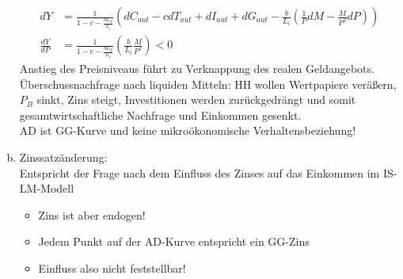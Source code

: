 \documentclass{scrartcl}
\begin{document}
\begin{enumerate}[a)]
\begin{align*}
     dY &= \frac{1}{1-c -\frac{b L_Y}{L_i}} \left(dC_{aut} - c dT_{aut} + dI_{aut} +dG_{aut} - \frac{b}{L_i} \left(\frac{1}{P}dM-\frac{M}{P^2}dP\right)\right)\\
     \frac{dY}{dP} &= \frac{1}{1-c -\frac{b L_Y}{L_i}} \left(\frac{b}{L_i}\frac{M}{P^2}\right) <0
  \end{align*}
  Anstieg des Preisniveaus f\"{u}hrt zu Verknappung des realen Geldangebots. \"{U}berschussnachfrage nach liquiden Mitteln: HH wollen Wertpapiere ver\"{a}{\ss}ern, $P_B$ sinkt, Zins steigt, Investitionen werden zur\"{u}ckgedr\"{a}ngt und somit gesamtwirtschaftliche Nachfrage und Einkommen gesenkt.\\
  AD ist GG-Kurve und keine mikro\"{o}konomische Verhaltensbeziehung!\\
  \item Zinssatz\"{a}nderung:\\
  Entspricht der Frage nach dem Einfluss des Zinses auf das Einkommen im IS-LM-Modell
  \begin{itemize}
    \item Zins ist aber endogen!
    \item Jedem Punkt auf der AD-Kurve entspricht ein GG-Zins
    \item Einfluss also nicht feststellbar!
  \end{itemize}


\end{enumerate}
\end{document}
